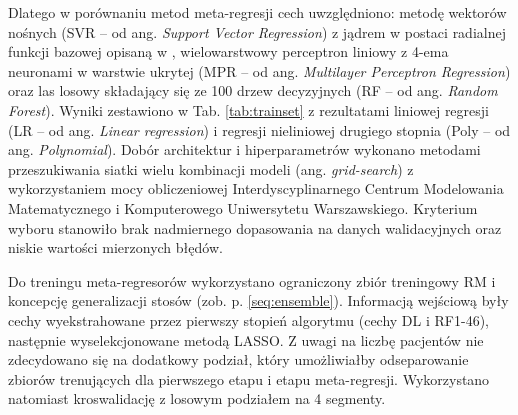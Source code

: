 Dlatego w porównaniu metod meta-regresji cech uwzględniono: metodę wektorów nośnych (SVR -- od ang. \textit{Support Vector Regression}) z jądrem w postaci radialnej funkcji bazowej opisaną w \cite{SVR_drucker}, wielowarstwowy perceptron liniowy z 4-ema neuronami w warstwie ukrytej (MPR -- od ang. \textit{Multilayer Perceptron Regression}) oraz las losowy składający się ze 100 drzew decyzyjnych (RF -- od ang. \textit{Random Forest}). Wyniki zestawiono w Tab. \ref{tab:trainset} z rezultatami liniowej regresji (LR -- od ang. \textit{Linear regression}) i regresji nieliniowej drugiego stopnia (Poly -- od ang. \textit{Polynomial}). Dobór architektur i hiperparametrów wykonano metodami przeszukiwania siatki wielu kombinacji modeli (ang. \textit{grid-search}) z wykorzystaniem mocy obliczeniowej Interdyscyplinarnego Centrum Modelowania Matematycznego i Komputerowego Uniwersytetu Warszawskiego. Kryterium wyboru stanowiło brak nadmiernego dopasowania na danych walidacyjnych oraz niskie wartości mierzonych błędów.

Do treningu meta-regresorów wykorzystano ograniczony zbiór treningowy RM i koncepcję generalizacji stosów (zob. p. \ref{seq:ensemble}). Informacją wejściową były cechy wyekstrahowane przez pierwszy stopień algorytmu (cechy DL i RF1-46), następnie wyselekcjonowane metodą LASSO. Z uwagi na liczbę pacjentów nie zdecydowano się na dodatkowy podział, który umożliwiałby odseparowanie zbiorów trenujących dla pierwszego etapu i etapu meta-regresji. Wykorzystano natomiast kroswalidację z losowym podziałem na 4 segmenty.  

